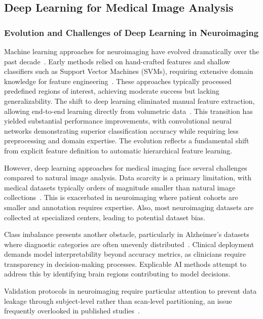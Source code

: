 \documentclass[11pt, a4paper]{article}
\begin{document}
\subsection{Deep Learning for Medical Image Analysis}

\subsubsection{Evolution and Challenges of Deep Learning in Neuroimaging}

Machine learning approaches for neuroimaging have evolved dramatically over the past decade~\cite{bari2021comparative}. Early methods relied on hand-crafted features and shallow classifiers such as Support Vector Machines (SVMs), requiring extensive domain knowledge for feature engineering~\cite{cuingnet2011automatic}. These approaches typically processed predefined regions of interest, achieving moderate success but lacking generalizability. The shift to deep learning eliminated manual feature extraction, allowing end-to-end learning directly from volumetric data~\cite{litjens2017survey}. This transition has yielded substantial performance improvements, with convolutional neural networks demonstrating superior classification accuracy while requiring less preprocessing and domain expertise. The evolution reflects a fundamental shift from explicit feature definition to automatic hierarchical feature learning.

However, deep learning approaches for medical imaging face several challenges compared to natural image analysis. Data scarcity is a primary limitation, with medical datasets typically orders of magnitude smaller than natural image collections~\cite{litjens2017survey}. This is exacerbated in neuroimaging where patient cohorts are smaller and annotation requires expertise. Also, most neuroimaging datasets are collected at specialized centers, leading to potential dataset bias.

Class imbalance presents another obstacle, particularly in Alzheimer's datasets where diagnostic categories are often unevenly distributed~\cite{davatzikos2019machine}. Clinical deployment demands model interpretability beyond accuracy metrics, as clinicians require transparency in decision-making processes. Explicable AI methods attempt to address this by identifying brain regions contributing to model decisions.

Validation protocols in neuroimaging require particular attention to prevent data leakage through subject-level rather than scan-level partitioning, an issue frequently overlooked in published studies~\cite{litjens2017survey}.
\end{document}
